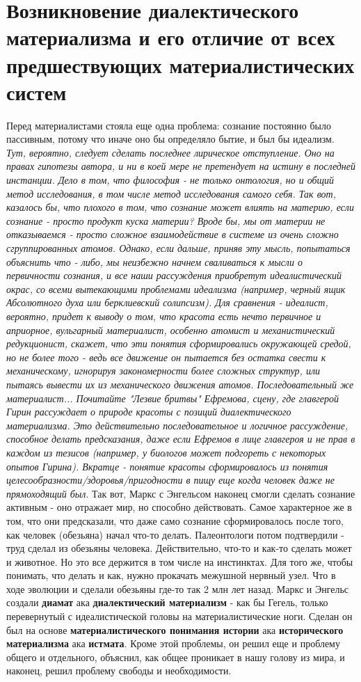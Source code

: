 \section{Возникновение диалектического материализма и его отличие от всех предшествующих материалистических систем}
Перед материалистами стояла еще одна проблема: сознание постоянно было пассивным, потому что иначе оно бы определяло бытие, и был бы идеализм. \textit{Тут, вероятно, следует сделать последнее лирическое отступление. Оно на правах гипотезы автора, и ни в коей мере не претендует на истину в последней инстанции. Дело в том, что философия - не только онтология, но и общий метод исследования, в том числе метод исследования самого себя. Так вот, казалось бы, что плохого в том, что сознание может влиять на материю, если сознание - просто продукт куска материи? Вроде бы, мы от материи не отказываемся - просто сложное взаимодействие  в системе из очень сложно сгруппированных атомов. Однако, если дальше, приняв эту мысль, попытаться объяснить что - либо, мы неизбежно начнем сваливаться к мысли о первичности сознания, и все наши рассуждения приобретут идеалистический окрас, со всеми вытекающими проблемами идеализма (например, черный ящик Абсолютного духа или берклиевский солипсизм). Для сравнения - идеалист, вероятно, придет к выводу о том, что красота есть нечто первичное и априорное, вульгарный материалист, особенно атомист и механистический редукционист, скажет, что эти понятия сформировались окружающей средой, но не более того - ведь все движение он пытается без остатка свести к механическому, игнорируя закономерности более сложных структур, или пытаясь вывести их из механического движения атомов. Последовательный же материалист... Почитайте "Лезвие бритвы" Ефремова, сцену, где главгерой Гирин рассуждает о природе красоты с позиций диалектического материализма. Это действительно последовательное и логичное рассуждение, способное делать предсказания, даже если Ефремов в лице главгероя и не прав в каждом из тезисов (например, у биологов может подгореть с некоторых опытов Гирина). Вкратце - понятие красоты сформировалось из понятия целесообразности/здоровья/пригодности в пищу еще когда человек даже не прямоходящий был}. Так вот, Маркс с Энгельсом наконец смогли сделать сознание активным - оно отражает мир, но способно действовать. Самое характерное же в том, что они предсказали, что даже само сознание сформировалось после того, как человек (обезьяна) начал что-то делать. Палеонтологи потом подтвердили - труд сделал из обезьяны человека. Действительно, что-то и как-то сделать может и животное. Но это все держится в том числе на инстинктах. Для того же, чтобы понимать, что делать и как, нужно прокачать межушной нервный узел. Что в ходе эволюции и сделали обезьяны где-то так 2 млн лет назад. Маркс и Энгельс создали \textbf{диамат} ака \textbf{диалектический материализм} - как бы Гегель, только перевернутый с идеалистической головы на материалистические ноги. Сделан он был на основе \textbf{материалистического понимания истории} ака \textbf{исторического материализма} ака \textbf{истмата}. Кроме этой проблемы, он решил еще и проблему общего и отдельного, объяснил, как общее проникает в нашу голову из мира, и наконец, решил проблему свободы и необходимости.

